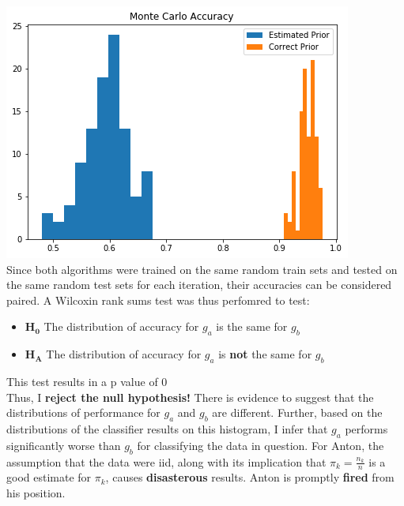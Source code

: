 \documentclass{article}
\begin{document}
      \includegraphics[scale=.5]{3}\\[6pt]
      Since both algorithms were trained on the same random train sets and tested on the same random test sets for each iteration, their accuracies can be considered paired. A Wilcoxin rank sums test was thus perfomred to test:
      \begin{itemize}
        \item[] $\mathbf{H_0}$ The distribution of accuracy for $g_a$ is the same for $g_b$
        \item[] $\mathbf{H_A}$ The distribution of accuracy for $g_a$ is \textbf{not} the same for $g_b$
      \end{itemize}
      This test results in a p value of $0$ \\[6pt]
      Thus, I \textbf{reject the null hypothesis!} There is evidence to suggest that the distributions of performance for $g_a$ and $g_b$ are different. Further, based on the distributions of the classifier results on this histogram, I infer that $g_a$ performs significantly worse than $g_b$ for classifying the data in question. For Anton, the assumption that the data were iid, along with its implication that $\hat \pi_k = \frac{n_k}{n}$ is a good estimate for $\pi_k$, causes \textbf{disasterous} results. Anton is promptly \textbf{fired} from his position.
\end{document}
